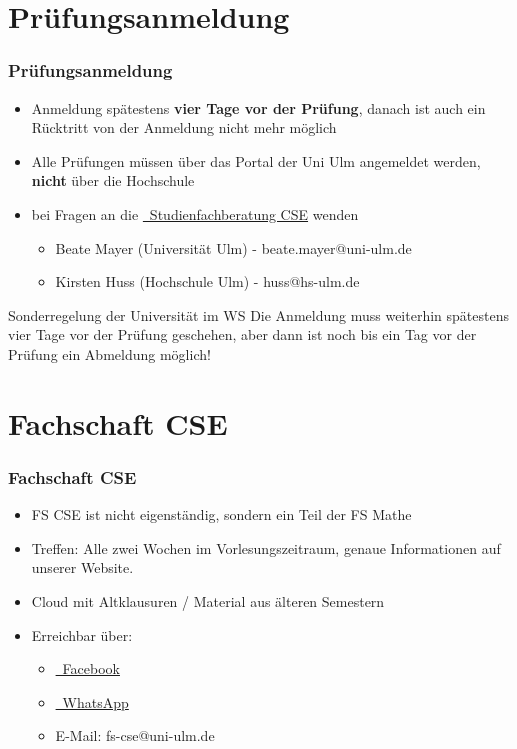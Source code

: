 \documentclass[10pt,a4paper]{beamer}
\begin{document}
    \section{Prüfungsanmeldung}
    \begin{frame}
        \frametitle{Prüfungsanmeldung}
        \begin{itemize}
            \setlength{\itemsep}{10pt} %
            \item Anmeldung spätestens \textbf{vier Tage vor der Prüfung}, danach ist auch ein Rücktritt von der Anmeldung nicht mehr möglich
            \item Alle Prüfungen müssen über das Portal der Uni Ulm angemeldet werden, \textbf{nicht} über die Hochschule
            \item bei Fragen an die \href{https://www.uni-ulm.de/mawi/mawi-cse/studienfachberatung/}{\Mundus~Studienfachberatung CSE} wenden
            \begin{itemize}
                \setlength{\itemsep}{10pt} %
                \item Beate Mayer (Universität Ulm) - beate.mayer@uni-ulm.de
                \item Kirsten Huss (Hochschule Ulm) - huss@hs-ulm.de
            \end{itemize}
        \end{itemize}
        \begin{alertblock}{Sonderregelung der Universität im WS}
            Die Anmeldung muss weiterhin spätestens vier Tage vor der Prüfung geschehen, aber dann ist noch bis ein Tag vor der Prüfung ein Abmeldung möglich!
        \end{alertblock}
    \end{frame}


    \section{Fachschaft CSE}
    \begin{frame}
        \frametitle{Fachschaft CSE}
        \begin{itemize}
            \setlength{\itemsep}{10pt} %
            \item FS CSE ist nicht eigenständig, sondern ein Teil der FS Mathe
            \item Treffen: Alle zwei Wochen im Vorlesungszeitraum, genaue Informationen auf unserer Website.
            \item Cloud mit Altklausuren / Material aus älteren Semestern
            \item Erreichbar über:
            \begin{itemize}
                \item \href{https://www.facebook.com/groups/356850697732243/}{\Mundus~Facebook}
                \item \href{https://chat.whatsapp.com/CQYUbnH2UGZLXuFFrI0VxO}{\Mundus~WhatsApp}
                \item E-Mail: fs-cse@uni-ulm.de
            \end{itemize}
        \end{itemize}
    \end{frame}
\end{document}

